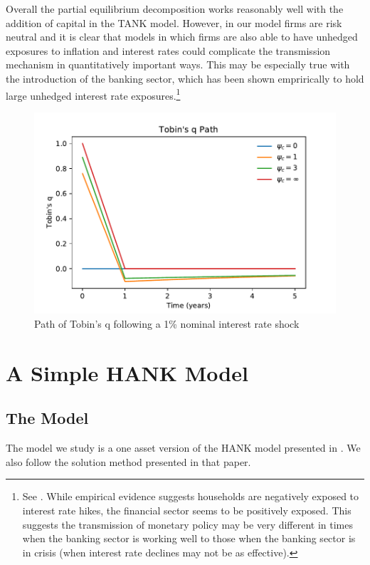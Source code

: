 \documentclass[12pt,a4paper]{article}
\begin{document}
Overall the partial equilibrium decomposition works reasonably well with the addition of capital in the TANK model. However, in our model firms are risk neutral and it is clear that models in which firms are also able to have unhedged exposures to inflation and interest rates could complicate the transmission mechanism in quantitatively important ways. This may be especially true with the introduction of the banking sector, which has been shown emprirically to hold large unhedged interest rate exposures.\footnote{See \cite{landier_banks_2013}. While empirical evidence suggests households are negatively exposed to interest rate hikes, the financial sector seems to be positively exposed. This suggests the transmission of monetary policy may be very different in times when the banking sector is working well to those when the banking sector is in crisis (when interest rate declines may not be as effective).}

\begin{figure} 
	\begin{centering}
		\includegraphics[scale=0.7]{../Python/DoloCode/Figures/TANK_capital_IRF_q.pdf}
		\caption{Path of Tobin's q following a 1\% nominal interest rate shock}
		\label{fig:PathTobinq}
	\end{centering}
\end{figure}

\section{A Simple HANK Model}

\subsection{The Model}
The model we study is a one asset version of the HANK model presented in \cite{blSolving}. We also follow the solution method presented in that paper.
\end{document}
